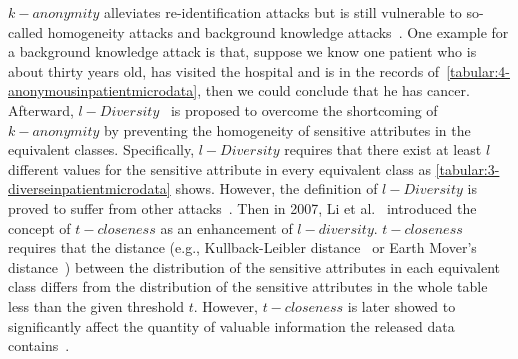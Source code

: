 $k-anonymity$ alleviates re-identification attacks but is still vulnerable to so-called homogeneity attacks and background knowledge attacks~\cite{machanavajjhala2007diversity}. One example for a background knowledge attack is that, suppose we know one patient who is about thirty years old, has visited the hospital and is in the records of~\autoref{tabular:4-anonymousinpatientmicrodata}, then we could conclude that he has cancer. Afterward, $l-Diversity$~\cite{machanavajjhala2007diversity} is proposed to overcome the shortcoming of $k-anonymity$ by preventing the homogeneity of sensitive attributes in the equivalent classes. Specifically, $l-Diversity$ requires that there exist at least $l$ different values for the sensitive attribute in every equivalent class as \autoref{tabular:3-diverseinpatientmicrodata} shows. However, the definition of $l-Diversity$ is proved to suffer from other attacks~\cite{li2007t}. Then in 2007, Li et al.~\cite{li2007t} introduced the concept of $t-closeness$ as an enhancement of $l-diversity$. $t-closeness$ requires that the distance (e.g., Kullback-Leibler distance~\cite{kullback1951information} or Earth Mover's distance~\cite{rubner2000earth}) between the distribution of the sensitive attributes in each equivalent class differs from the distribution of the sensitive attributes in the whole table less than the given threshold $t$. However, $t-closeness$ is later showed to significantly affect the quantity of valuable information the released data contains~\cite{li2009closeness}.

